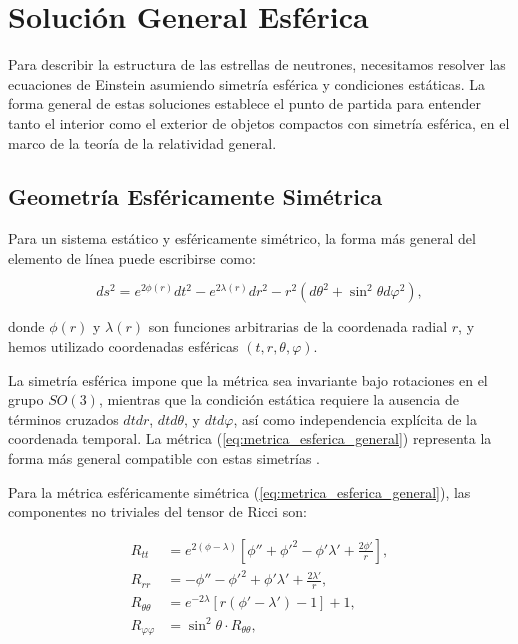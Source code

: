 \section{Solución General Esférica}

Para describir la estructura de las estrellas de neutrones, necesitamos resolver las ecuaciones de Einstein asumiendo simetría esférica y condiciones estáticas. La forma general de estas soluciones establece el punto de partida para entender tanto el interior como el exterior de objetos compactos con simetría esférica, en el marco de la teoría de la relatividad general.

\subsection{Geometría Esféricamente Simétrica}

Para un sistema estático y esféricamente simétrico, la forma más general del elemento de línea puede escribirse como:

\begin{equation}
	ds^2 = e^{2\phi(r)}dt^2 - e^{2\lambda(r)}dr^2 - r^2(d\theta^2 + \sin^2\theta d\varphi^2),
	\label{eq:metrica_esferica_general}
\end{equation}

donde $\phi(r)$ y $\lambda(r)$ son funciones arbitrarias de la coordenada radial $r$, y hemos utilizado coordenadas esféricas $(t,r,\theta,\varphi)$.

La simetría esférica impone que la métrica sea invariante bajo rotaciones en el grupo $SO(3)$, mientras que la condición estática requiere la ausencia de términos cruzados $dt dr$, $dt d\theta$, y $dt d\varphi$, así como independencia explícita de la coordenada temporal. La métrica (\ref{eq:metrica_esferica_general}) representa la forma más general compatible con estas simetrías \cite{misnerGravitation2017}.


Para la métrica esféricamente simétrica (\ref{eq:metrica_esferica_general}), las componentes no triviales del tensor de Ricci son:

\begin{align}
	R_{tt} &= e^{2(\phi-\lambda)}\left[\phi'' + \phi'^2 - \phi'\lambda' + \frac{2\phi'}{r}\right], \\
	R_{rr} &= -\phi'' - \phi'^2 + \phi'\lambda' + \frac{2\lambda'}{r}, \\
	R_{\theta\theta} &= e^{-2\lambda}\left[r(\phi' - \lambda') - 1\right] + 1, \\
	R_{\varphi\varphi} &= \sin^2\theta \cdot R_{\theta\theta},
\end{align}


